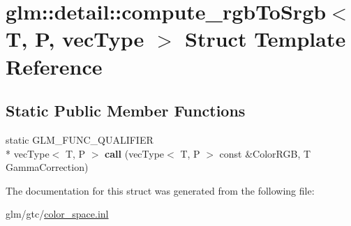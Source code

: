 \hypertarget{structglm_1_1detail_1_1compute__rgbToSrgb}{\section{glm\-:\-:detail\-:\-:compute\-\_\-rgb\-To\-Srgb$<$ T, P, vec\-Type $>$ Struct Template Reference}
\label{structglm_1_1detail_1_1compute__rgbToSrgb}
}
\subsection*{Static Public Member Functions}
\begin{DoxyCompactItemize}
\item 
\hypertarget{structglm_1_1detail_1_1compute__rgbToSrgb_a641d15ac773c5b20ad9917ec0ea2974c}{static G\-L\-M\-\_\-\-F\-U\-N\-C\-\_\-\-Q\-U\-A\-L\-I\-F\-I\-E\-R \\*
vec\-Type$<$ T, P $>$ {\bfseries call} (vec\-Type$<$ T, P $>$ const \&Color\-R\-G\-B, T Gamma\-Correction)}\label{structglm_1_1detail_1_1compute__rgbToSrgb_a641d15ac773c5b20ad9917ec0ea2974c}

\end{DoxyCompactItemize}


The documentation for this struct was generated from the following file\-:\begin{DoxyCompactItemize}
\item 
glm/gtc/\hyperlink{gtc_2color__space_8inl}{color\-\_\-space.\-inl}\end{DoxyCompactItemize}

